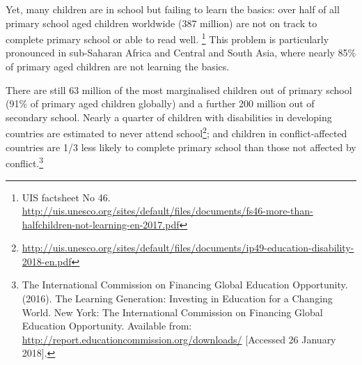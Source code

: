 Yet, many children are in school but failing to learn the basics: over half of all primary school aged children worldwide (387 million) are not on track to complete primary school or able to read well. \footnote{UIS factsheet No 46. \href{http://uis.unesco.org/sites/default/files/documents/fs46-more-than-halfchildren-not-learning-en-2017.pdf}{http://uis.unesco.org/sites/default/files/documents/fs46-more-than-halfchildren-not-learning-en-2017.pdf}}
This problem is particularly pronounced in sub-Saharan Africa and Central and South Asia, where nearly 85\% of primary aged children are not learning the basics. %

There are still 63 million of the most marginalised children out of primary school
(91\% of primary aged children globally) and a further 200 million out of secondary
school. %
Nearly a quarter of children with disabilities in developing countries are
estimated to never attend school\footnote{\href{http://uis.unesco.org/sites/default/files/documents/ip49-education-disability-2018-en.pdf}{http://uis.unesco.org/sites/default/files/documents/ip49-education-disability-2018-en.pdf}}; and children in conflict-affected countries are 1/3
less likely to complete primary school than those not affected by conflict.\footnote{The International Commission on Financing Global Education Opportunity. (2016). The Learning Generation: Investing in Education for a Changing World. New York: The International Commission on Financing Global Education Opportunity. Available from: \href{http://report.educationcommission.org/downloads/}{http://report.educationcommission.org/downloads/} [Accessed 26 January 2018].}


\newpage
